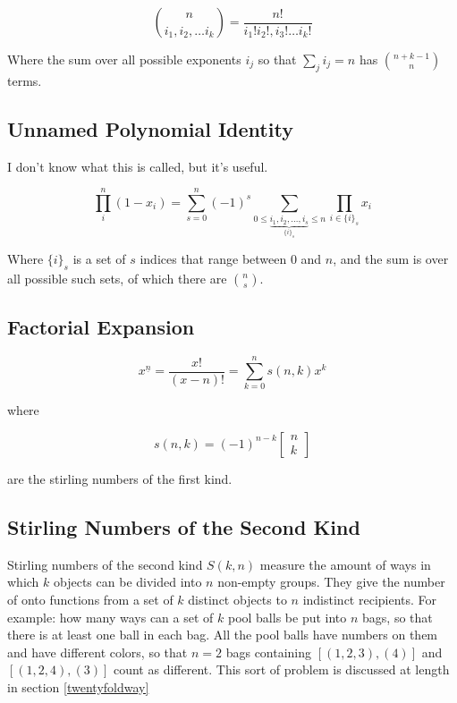 \begin{equation}
{n \choose i_1,i_2,\hdots i_k} = \frac{n!}{i_1!i_2!,i_3!\hdots i_k!}
\end{equation}

Where the sum over all possible exponents $i_j$ so that $\sum_j i_j = n$ has ${n+k-1 \choose n}$ terms. 

\subsection{Unnamed Polynomial Identity}
I don't know what this is called, but it's useful.

\begin{equation}
\prod_i^n (1-x_i) = \sum_{s=0}^{n} (-1)^s \sum_{0\leq \underbrace{i_1,i_2,...,i_s }_{\{i\}_s} \leq n} \prod_{i \in \{i\}_s} x_i
\end{equation}

Where $\{i\}_s$ is a set of $s$ indices that range between $0$ and $n$, and the sum is over all possible such sets, of which there are ${n \choose s}$.  


\subsection{Factorial Expansion}

\begin{equation}
x^{\underline{n}} = \frac{x!}{(x-n)!} = \sum_{k=0}^n s(n,k)x^k
\end{equation}

where

\begin{equation}
s(n,k) = (-1)^{n-k}\left[\begin{array}{c} n\\k \end{array}\right]
\end{equation}

are the stirling numbers of the first kind.



\subsection{Stirling Numbers of the Second Kind}
\label{sec:stirling2}

Stirling numbers of the second kind $S(k,n)$ measure the amount of ways in which $k$ objects can be divided into $n$ non-empty groups. They give the number of onto functions from a set of $k$ distinct objects to $n$ indistinct recipients. For example: how many ways can a set of $k$ pool balls be put into $n$ bags, so that there is at least one ball in each bag. All the pool balls have numbers on them and have different colors, so that $n=2$ bags containing $[(1,2,3), (4)] $ and $[(1,2,4),(3)]$ count as different. This sort of problem is discussed at length in section \ref{twentyfoldway}

